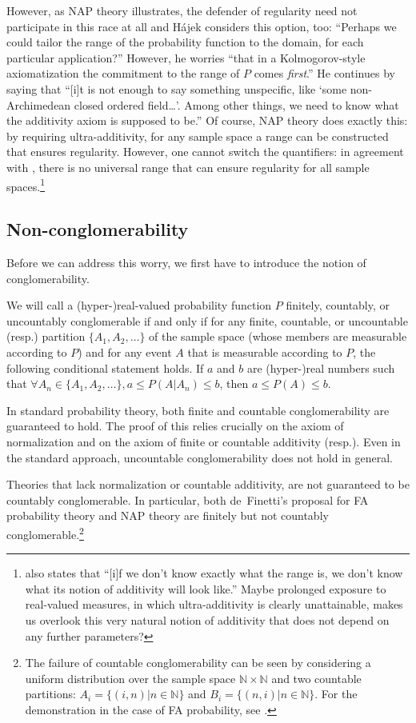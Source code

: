 However, as NAP theory illustrates, the defender of regularity need not participate in this race at all and H{\'a}jek considers this option, too: ``Perhaps we could tailor the range of the probability function to the domain, for each particular application?'' However, he worries ``that in a Kolmogorov-style axiomatization the commitment to the range of $P$ comes \emph{first}.'' He continues by saying that ``[i]t is not enough to say something unspecific, like `some non-Archimedean closed ordered field\ldots'. Among other things, we need to know
what the additivity axiom is supposed to be.'' Of course, NAP theory does exactly this: by requiring ultra-additivity, for any  sample space a range can be constructed that ensures regularity. However, one cannot switch the quantifiers: in agreement with \citet{Pruss:2013}, there is no universal range that can ensure regularity for all sample spaces.\footnote{\citet{Hajek:2012b} also states that ``[i]f we don't know exactly what the range is, we don't know what its notion of additivity will look like.'' Maybe prolonged exposure to real-valued measures, in which ultra-additivity is clearly unattainable, makes us overlook this very natural notion of additivity that does not depend on any further parameters?}

\subsection{Non-conglomerability}
Before we can address this worry, we first have to introduce the notion of conglomerability.

We will call a (hyper-)real-valued probability function $P$ finitely, countably, or uncountably conglomerable if and only if for any finite, countable, or uncountable (resp.) partition $\{A_1, A_2, \ldots \}$ of the sample space (whose members are measurable according to $P$) and for any event $A$ that is measurable according to $P$, the following conditional statement holds. If $a$ and $b$ are (hyper-)real numbers such that $\forall A_n \in \{A_1, A_2, \ldots \}, a \leq P(A|A_n) \leq b$, then $a \leq P(A) \leq b$.

In standard probability theory, both finite and countable conglomerability are guaranteed to hold. The proof of this relies crucially on the axiom of normalization and on the axiom of finite or countable additivity (resp.). Even in the standard approach, uncountable conglomerability does not hold in general.

Theories that lack normalization or countable additivity, are not guaranteed to be countably conglomerable. In particular, both de~Finetti's proposal for FA probability theory and NAP theory are finitely but not countably conglomerable.\footnote{The failure of countable conglomerability can be seen by considering a uniform distribution over the sample space $\mathbb{N}\times\mathbb{N}$ and two countable partitions: $A_i = \{(i,n) | n\in \mathbb{N} \}$ and $B_i=\{(n,i) | n \in \mathbb{N} \}$. For the demonstration in the case of FA probability, see \citet[Ch.~5]{deFinetti:1972}.}

